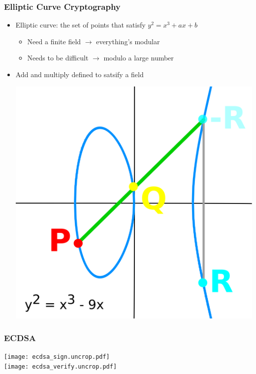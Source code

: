 \documentclass{beamer}
\begin{document}
\begin{frame}
  \frametitle{Elliptic Curve Cryptography}


  \begin{itemize}
  \item Elliptic curve: the set of points that satisfy
    $ y^2 = x^3 + ax + b $
    \begin{itemize}
    \item Need a finite field $\rightarrow$ everything's modular
    \item Needs to be difficult $\rightarrow$ modulo a large number
    \end{itemize}
  \item Add and multiply defined to satsify a field
    \begin{center}
      \includegraphics[width=0.6\linewidth]{point_add.png}
    \end{center}
  \end{itemize}
\end{frame}

\begin{frame}
  \frametitle{ECDSA}

  \begin{center}
    \begin{multicols}{2}
      \texttt{[image: ecdsa\_sign.uncrop.pdf]} \\
      \texttt{[image: ecdsa\_verify.uncrop.pdf]} \\
    \end{multicols}
  \end{center}
\end{frame}
\end{document}
